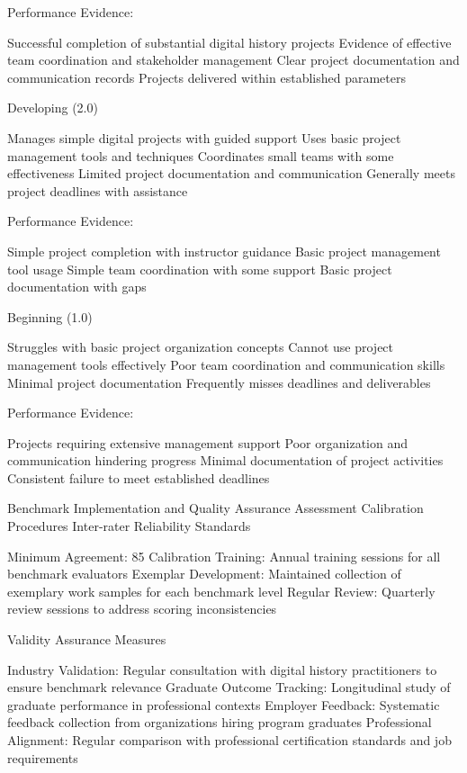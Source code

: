 \begin{appendices}
Performance Evidence:

Successful completion of substantial digital history projects
Evidence of effective team coordination and stakeholder management
Clear project documentation and communication records
Projects delivered within established parameters

Developing (2.0)

Manages simple digital projects with guided support
Uses basic project management tools and techniques
Coordinates small teams with some effectiveness
Limited project documentation and communication
Generally meets project deadlines with assistance

Performance Evidence:

Simple project completion with instructor guidance
Basic project management tool usage
Simple team coordination with some support
Basic project documentation with gaps

Beginning (1.0)

Struggles with basic project organization concepts
Cannot use project management tools effectively
Poor team coordination and communication skills
Minimal project documentation
Frequently misses deadlines and deliverables

Performance Evidence:

Projects requiring extensive management support
Poor organization and communication hindering progress
Minimal documentation of project activities
Consistent failure to meet established deadlines


Benchmark Implementation and Quality Assurance
Assessment Calibration Procedures
Inter-rater Reliability Standards

Minimum Agreement: 85%
Calibration Training: Annual training sessions for all benchmark evaluators
Exemplar Development: Maintained collection of exemplary work samples for each benchmark level
Regular Review: Quarterly review sessions to address scoring inconsistencies

Validity Assurance Measures

Industry Validation: Regular consultation with digital history practitioners to ensure benchmark relevance
Graduate Outcome Tracking: Longitudinal study of graduate performance in professional contexts
Employer Feedback: Systematic feedback collection from organizations hiring program graduates
Professional Alignment: Regular comparison with professional certification standards and job requirements


\end{appendices}
